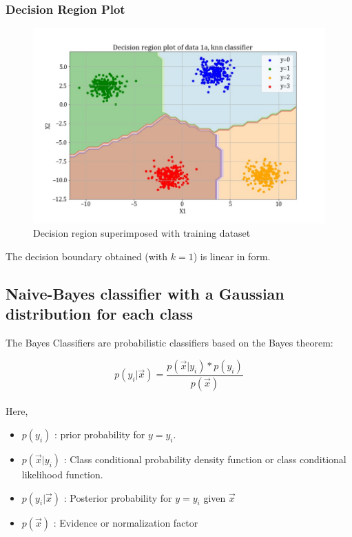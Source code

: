 \documentclass[11pt,a4paper]{article}
\newcommand{\noi}{\noindent}
\begin{document}
\subsubsection{Decision Region Plot}
\begin{figure}[H]
    \centering
    \includegraphics[scale=0.9]{images/1a_knn_decision_region.jpg}
    \caption{Decision region superimposed with training dataset}
    \label{fig:1A_decreg_KNN}
\end{figure}

The decision boundary obtained (with $k=1$) is linear in form. 

\break
\subsection{Naive-Bayes classifier with a Gaussian distribution for each class}
The Bayes Classifiers are probabilistic classifiers based on the Bayes theorem:

\begin{equation}
\label{eqn nb}
    p(y_{i}|\vec{x})=\frac{p(\vec{x}|y_{i})*p(y_{i})}{p(\vec{x})}
\end{equation}\\

\noi
Here,
\begin{itemize}
    \itemsep0em
    \item $p(y_{i})$ : prior probability for $y=y_{i}$.
    \item $p(\vec{x}|y_{i})$ : Class conditional probability density function or class conditional likelihood function.
    \item $p(y_{i}|\vec{x})$ : Posterior probability for $y=y_{i}$ given $\vec{x}$
    \item $p(\vec{x})$ : Evidence or normalization factor
\end{itemize}
\end{document}
